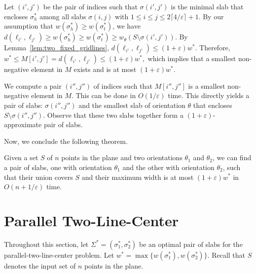 \documentclass[english,a4paper, cleveref, autoref, thm-restate, nolineno]{socg-lipics-v2021}
\theoremstyle{star}
\theoremstyle{claimstar}
\newcommand{\eps}{\ensuremath{\varepsilon}}
\begin{document}
Let $(i', j')$ be the pair of indices such that $\sigma(i', j')$ is the minimal slab that encloses $\sigma_h^*$ among all slabs $\sigma(i,j)$ with 
$1 \le i \le j \le 2\lceil 4/\eps \rceil + 1$.
By our assumption that $w(\sigma_h^*) \ge w(\sigma_t^*)$, we have 
$d(\ell_{i'}, \ell_{j'}) \ge w(\sigma_h^*) \ge w(\sigma_t^*)  \ge w_\theta(S \setminus \sigma(i', j'))$. 
By Lemma~\ref{lem:two_fixed_gridlines}, 
$d(\ell_{i'}, \ell_{j'}) \le (1+\eps)w^*$. 
Therefore,
$w^* \le M[i', j'] = d(\ell_{i'}, \ell_{j'}) \le (1+\eps)w^*,$
which implies that a smallest non-negative element in $M$ exists and is at most $(1+\eps)w^*$.

We compute a pair $(i'', j'')$ of indices such that $M[i'', j'']$ is a smallest non-negative element in $M$. This can be done in $O(1/\eps)$ time.
This directly yields a pair of slabs: $\sigma(i'', j'')$ and the smallest slab of orientation $\theta$ that encloses $S \setminus \sigma(i'', j'')$.  
Observe that these two slabs together form a $(1+\eps)$-approximate pair of slabs.

Now, we conclude the following theorem.

\begin{theorem}
    \label{thm:two_fixed_apx}
    Given a set $S$ of $n$ points in the plane and two orientations $\theta_1$ and $\theta_2$, 
    we can find a pair of slabs, one with orientation $\theta_1$ and the other with orientation $\theta_2$, such that their union covers $S$ and their maximum width is at most $(1+\eps)w^*$ in $O(n + 1/\eps)$ time.
\end{theorem}


\section{Parallel Two-Line-Center}
\label{sec:parallel}



Throughout this section, let $\Sigma^* = (\sigma_1^*, \sigma_2^* )$ be an optimal pair of slabs for the parallel-two-line-center problem.
Let $w^* = \max \{w(\sigma_1^*), w(\sigma_2^*) \}$.
Recall that $S$ denotes the input set of $n$ points in the plane. 
\end{document}
